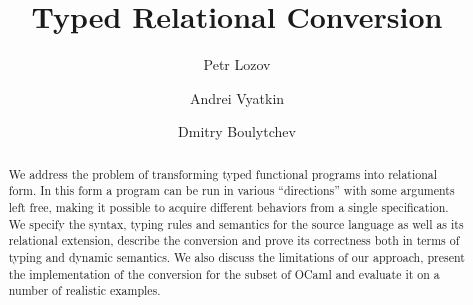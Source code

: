 \documentclass{llncs}
\begin{document}
\mainmatter

\title{Typed Relational Conversion}

\author{
  Petr Lozov \and Andrei Vyatkin \and Dmitry Boulytchev
}



\maketitle

\begin{abstract}
We address the problem of transforming typed functional programs into relational form. 
In this form a program can be run in various ``directions'' with some arguments left free, 
making it possible to acquire different behaviors from a single specification. We specify the 
syntax, typing rules and semantics for the source language as well as its relational extension, 
describe the conversion and prove its correctness both in terms of typing and dynamic semantics. 
We also discuss the limitations of our approach, present the implementation of the conversion for 
the subset of OCaml and evaluate it on a number of realistic examples.
\end{abstract}







\end{document}
